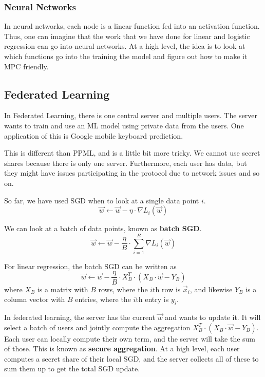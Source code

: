\subsubsection{Neural Networks}

In neural networks, each node is a linear function fed into an activation function. Thus, one can imagine that the work that we have done for linear and logistic regression can go into neural networks. At a high level, the idea is to look at which functions go into the training the model and figure out how to make it MPC friendly.

\subsection{Federated Learning}

In Federated Learning, there is one central server and multiple users. The server wants to train and use an ML model using private data from the users. One application of this is Google mobile keyboard prediction.

This is different than PPML, and is a little bit more tricky. We cannot use secret shares because there is only one server. Furthermore, each user has data, but they might have issues participating in the protocol due to network issues and so on.

So far, we have used SGD when to look at a single data point $i$. 
$$\vec{w} \gets \vec{w} - \eta \cdot \nabla L_i(\vec{w})$$

We can look at a batch of data points, known as \textbf{batch SGD}.
$$\vec{w} \gets \vec{w} - \frac{\eta}{B} \cdot \sum_{i = 1}^B\nabla L_i(\vec{w})$$

For linear regression, the batch SGD can be written as
$$\vec{w} \gets \vec{w} - \frac{\eta}{B} \cdot X_B^T \cdot (X_B \cdot \vec{w} - Y_B)$$
where $X_B$ is a matrix with $B$ rows, where the $i$th row is $\vec{x}_i$, and likewise $Y_B$ is a column vector with $B$ entries, where the $i$th entry is $y_i$.

In federated learning, the server has the current $\vec{w}$ and wants to update it. It will select a batch of users and jointly compute the aggregation $X_B^T \cdot (X_B \cdot \vec{w} - Y_B)$. Each user can locally compute their own term, and the server will take the sum of those. This is known as \textbf{secure aggregation}. At a high level, each user computes a secret share of their local SGD, and the server collects all of these to sum them up to get the total SGD update.

